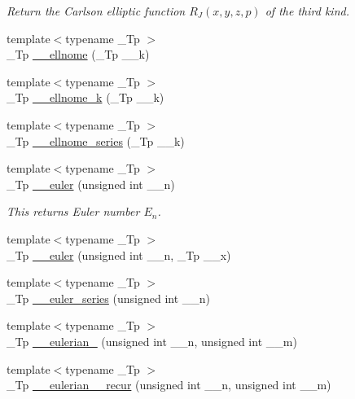 \begin{DoxyCompactItemize}
\begin{DoxyCompactList}\small\item\em Return the Carlson elliptic function $ R_J(x,y,z,p) $ of the third kind. \end{DoxyCompactList}\item 
{\footnotesize template$<$typename \+\_\+\+Tp $>$ }\\\+\_\+\+Tp \hyperlink{namespacestd_1_1____detail_ac94c9cd28ee7973229e4a63d9b984711}{\+\_\+\+\_\+ellnome} (\+\_\+\+Tp \+\_\+\+\_\+k)
\item 
{\footnotesize template$<$typename \+\_\+\+Tp $>$ }\\\+\_\+\+Tp \hyperlink{namespacestd_1_1____detail_a7631f367a1be34f98cec2021d588457b}{\+\_\+\+\_\+ellnome\+\_\+k} (\+\_\+\+Tp \+\_\+\+\_\+k)
\item 
{\footnotesize template$<$typename \+\_\+\+Tp $>$ }\\\+\_\+\+Tp \hyperlink{namespacestd_1_1____detail_aec07b9131f90495831d349d22768425f}{\+\_\+\+\_\+ellnome\+\_\+series} (\+\_\+\+Tp \+\_\+\+\_\+k)
\item 
{\footnotesize template$<$typename \+\_\+\+Tp $>$ }\\\+\_\+\+Tp \hyperlink{namespacestd_1_1____detail_a38f2ed4541c9876b8549c3917aad3b08}{\+\_\+\+\_\+euler} (unsigned int \+\_\+\+\_\+n)
\begin{DoxyCompactList}\small\item\em This returns Euler number $ E_n $. \end{DoxyCompactList}\item 
{\footnotesize template$<$typename \+\_\+\+Tp $>$ }\\\+\_\+\+Tp \hyperlink{namespacestd_1_1____detail_aa44d18f565c3c36ba0351374dc4af09d}{\+\_\+\+\_\+euler} (unsigned int \+\_\+\+\_\+n, \+\_\+\+Tp \+\_\+\+\_\+x)
\item 
{\footnotesize template$<$typename \+\_\+\+Tp $>$ }\\\+\_\+\+Tp \hyperlink{namespacestd_1_1____detail_a2e3eb67dee4d0b5c96824a4e8e9c227e}{\+\_\+\+\_\+euler\+\_\+series} (unsigned int \+\_\+\+\_\+n)
\item 
{\footnotesize template$<$typename \+\_\+\+Tp $>$ }\\\+\_\+\+Tp \hyperlink{namespacestd_1_1____detail_a4556229d8792527574bfc6fa135908dd}{\+\_\+\+\_\+eulerian\+\_} (unsigned int \+\_\+\+\_\+n, unsigned int \+\_\+\+\_\+m)
\item 
{\footnotesize template$<$typename \+\_\+\+Tp $>$ }\\\+\_\+\+Tp \hyperlink{namespacestd_1_1____detail_afab99319465d188432fa8357d65129e0}{\+\_\+\+\_\+eulerian\+\_\+\_\+recur} (unsigned int \+\_\+\+\_\+n, unsigned int \+\_\+\+\_\+m)

\end{DoxyCompactItemize}
